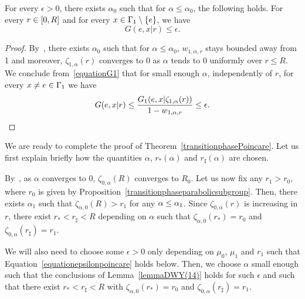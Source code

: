 \documentclass[AHL,Unicode,longabstracts]{cedram}
\let\oldin\in
\renewcommand{\in}{\mathchoice{\oldin}{\oldin}{\,\oldin\,}{\,\oldin\,}}
\let\oldle\le
\renewcommand{\le}{\mathchoice{\oldle}{\oldle}{\,\oldle\,}{\,\oldle\,}}
\begin{document}
\begin{lemm}\label{lemmaDWY(14)}
For every $\epsilon>0$, there exists $\alpha_0$ such that for $\alpha\leq \alpha_0$, the following holds. For every $r\in [0,R]$ and for every $x\in \Gamma_1\setminus\{e\}$, we have
\[
G(e,x|r)\leq \epsilon.
\]
\end{lemm}

\begin{proof}
By~\cite[Lemma~3.15]{DWY}, there exists $\alpha_0$ such that for $\alpha\leq \alpha_0$, $w_{1,\alpha,r}$ stays bounded away from 1 and moreover, $\zeta_{1,\alpha}(r)$ converges to 0 as $\alpha$ tends to 0 uniformly over $r\leq R$. We conclude from~\eqref{equationG1} that for small enough $\alpha$, independently of $r$, for every $x\neq e\in \Gamma_1$ we have
\begin{equation*}\label{thirdboundpoincare}
G(e,x|r)\leq \frac{G_1(e,x|\zeta_{1,\alpha}(r))}{1-w_{1,\alpha,r}}\leq \epsilon. \qedhere
\end{equation*}
\end{proof}



We are ready to complete the proof of Theorem~\ref{transitionphasePoincare}. Let us first explain briefly how the quantities $\alpha$, $r_*(\alpha)$ and $r_\sharp(\alpha)$ are chosen.

By~\cite[Lemma~3.14]{DWY}, as $\alpha$ converges to 0, $\zeta_{0,\alpha}(R)$ converges to $R_0$. Let us now fix any $r_1>r_0$, where $r_0$ is given by Proposition~\ref{transitionphaseparabolicsubgroup}. Then, there exists $\alpha_1$ such that $\zeta_{\alpha, 0}(R)>r_1$ for any $\alpha\le \alpha_1$. Since $\zeta_{0,\alpha}(r)$ is increasing in $r$, there exist $r_*<r_\sharp <R$ depending on $\alpha$ such that $\zeta_{\alpha,0}(r_*)=r_0$ and $\zeta_{0,\alpha}(r_\sharp)=r_1$.

We will also need to choose some $\epsilon>0$ only depending on $\mu_0$, $\mu_1$ and $r_1$ such that Equation~\eqref{equationepsilonpoincare} holds below. Then, we choose $\alpha$ small enough such that the conclusions of Lemma~\ref{lemmaDWY(14)} holds for such $\epsilon$ and such that there exist $r_*<r_\sharp <R$ with $\zeta_{\alpha,0}(r_*)=r_0$ and $\zeta_{0,\alpha}(r_\sharp)=r_1$.
\end{document}

